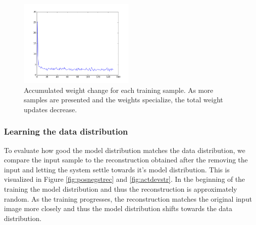 \begin{figure}[h!]
	\centering
    	\includegraphics[width=0.5\textwidth]{imgs/inspect/wdiff.png} 
    \caption[Weight change during training.]{Accumulated weight change for each training sample. As more samples are presented and the weights specialize, the total weight updates decrease.}
	\label{fig:ecdwdiff}
\end{figure}



\subsubsection{Learning the data distribution} \label{c:datadistexp}

To evaluate how good the model distribution matches the data distribution, we compare the input sample to the reconstruction obtained after the removing the input and letting the system settle towards it's model distribution.
This is visualized in Figure \ref{fig:posnegstrec} and \ref{fig:actdevstr}.
In the beginning of the training the model distribution and thus the reconstruction is approximately random.
As the training progresses, the reconstruction matches the original input image more closely and thus the model distribution shifts towards the data distribution.

